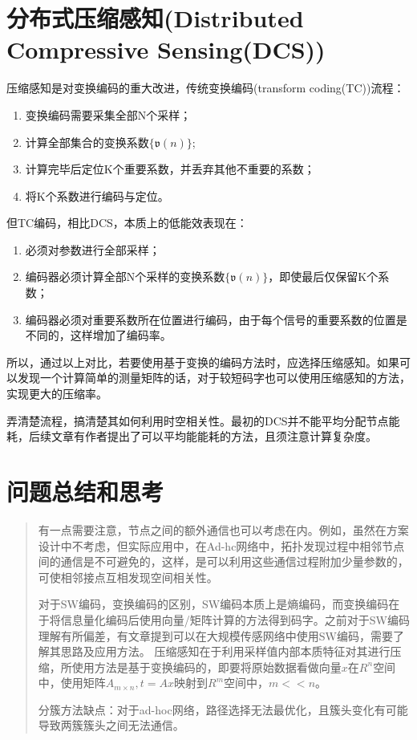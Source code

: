 \section{分布式压缩感知(Distributed Compressive Sensing(DCS))}
压缩感知是对变换编码的重大改进，传统变换编码(transform coding(TC))流程：
\begin{enumerate}
    \item 变换编码需要采集全部N个采样；
    \item 计算全部集合的变换系数$\{\mathfrak{v}(n)\}$;
    \item 计算完毕后定位K个重要系数，并丢弃其他不重要的系数；
    \item 将K个系数进行编码与定位。
\end{enumerate}
但TC编码，相比DCS，本质上的低能效表现在：
\begin{enumerate}
    \item 必须对参数进行全部采样；
    \item 编码器必须计算全部N个采样的变换系数$\{\mathfrak{v}(n)\}$，即使最后仅保留K个系数；
    \item 编码器必须对重要系数所在位置进行编码，由于每个信号的重要系数的位置是不同的，这样增加了编码率。
\end{enumerate}

所以，通过以上对比，若要使用基于变换的编码方法时，应选择压缩感知。如果可以发现一个计算简单的测量矩阵的话，对于较短码字也可以使用压缩感知的方法，实现更大的压缩率。

弄清楚流程，搞清楚其如何利用时空相关性。最初的DCS并不能平均分配节点能耗，后续文章有作者提出了可以平均能能耗的方法，且须注意计算复杂度。

\section{问题总结和思考}
\begin{quote}	
	有一点需要注意，节点之间的额外通信也可以考虑在内。例如，虽然在方案设计中不考虑，但实际应用中，在Ad-hc网络中，拓扑发现过程中相邻节点间的通信是不可避免的，这样，是可以利用这些通信过程附加少量参数的，可使相邻接点互相发现空间相关性。
	
	对于SW编码，变换编码的区别，SW编码本质上是熵编码，而变换编码在于将信息量化编码后使用向量/矩阵计算的方法得到码字。\textcolor[rgb]{1,0,0}{之前对于SW编码理解有所偏差，有文章提到可以在大规模传感网络中使用SW编码，需要了解其思路及应用方法}。
	压缩感知在于利用采样值内部本质特征对其进行压缩，所使用方法是基于变换编码的，即要将原始数据看做向量$x$在$R^n$空间中，使用矩阵$A_{m\times n}, t=Ax$映射到$R^m$空间中，$m<<n$。
	
	
	分簇方法缺点：对于ad-hoc网络，路径选择无法最优化，且簇头变化有可能导致两簇簇头之间无法通信。
	
\end{quote}
